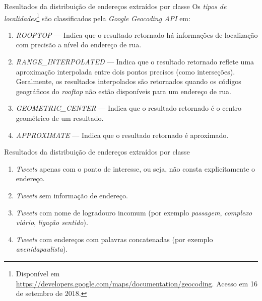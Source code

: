 \documentclass{beamer}
\begin{document}
\begin{frame}{Resultados da distribuição de endereços extraídos por classe}
Os \textit{tipos de localidades}\footnote{Disponível em \url{https://developers.google.com/maps/documentation/geocoding}. Acesso em 16 de setembro de 2018.} são classificados pela \textit{Google Geocoding API} em:
\begin{enumerate}
\item \textit{ROOFTOP} --- Indica que o resultado retornado há informações de localização com precisão a nível do endereço de rua.
\item \textit{RANGE\_INTERPOLATED} --- Indica que o resultado retornado reflete uma aproximação interpolada entre dois pontos precisos (como interseções). Geralmente, os resultados interpolados são retornados quando os códigos geográficos do \textit{rooftop} não estão disponíveis para um endereço de rua.
\item \textit{GEOMETRIC\_CENTER} --- Indica que o resultado retornado é o centro geométrico de um resultado.
\item \textit{APPROXIMATE} --- Indica que o resultado retornado é aproximado.
\end{enumerate}
\end{frame}
\begin{frame}{Resultados da distribuição de endereços extraídos por classe}
\begin{enumerate}
\item \textit{Tweets} apenas com o ponto de interesse, ou seja, não consta explicitamente o endereço.
\item \textit{Tweets} sem informação de endereço.
\item \textit{Tweets} com nome de logradouro incomum (por exemplo \emph{passagem}, \emph{complexo viário}, \emph{ligação sentido}).
\item \textit{Tweets} com endereços com palavras concatenadas (por exemplo \emph{avenidapaulista}).
\end{enumerate}
\end{frame}
\end{document}
